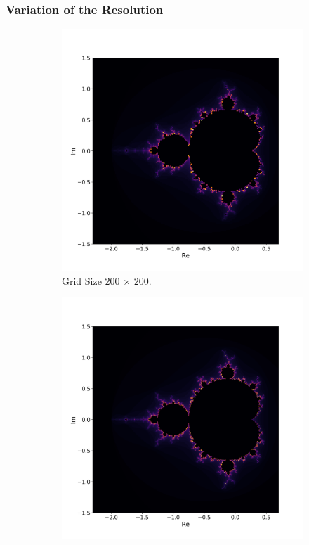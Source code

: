 \documentclass[
  12pt,					%
  a4paper,				%
  twoside,				%
]{report}
\begin{document}
\newpage
\subsubsection{Variation of the Resolution}

\begin{figure}[H]
\centering
\begin{subfigure}{.45\textwidth}
  \centering
  \includegraphics[width=\linewidth]{IMG/Res1.png}
  \caption{Grid Size $200 \, \times \, 200$.}
\end{subfigure}%
\begin{subfigure}{.45\textwidth}
  \centering
  \includegraphics[width=\linewidth]{IMG/Res2.png}

\end{subfigure}
\end{figure}
\end{document}
